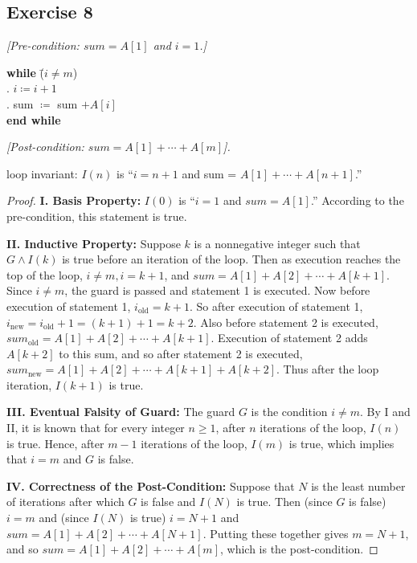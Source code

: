 \documentclass[14pt]{extarticle}
\begin{document}
\subsection{Exercise 8}
{\it [Pre-condition: $sum = A[1]$ and $i = 1$.]}

\begin{tabbing}
    {\bf while} \= ($i \neq m$) \\
    . $i \coloneqq i + 1$ \\
    . sum $\coloneqq$ sum $ + A[i]$ \\
    {\bf end while}
\end{tabbing}

{\it [Post-condition: $sum = A[1] + \cdots + A[m]$].}

loop invariant: $I(n)$ is ``$i = n + 1$ and sum = $A[1] + \cdots + A[n+1]$.''

\begin{proof}
    {\bf I. Basis Property:} $I(0)$ is “$i = 1$ and $sum = A[1]$.” According to the pre-condition, this statement is true.

        {\bf II. Inductive Property:} Suppose $k$ is a nonnegative integer such that $G \wedge I(k)$ is true before an iteration of the loop. Then as execution reaches the top of the loop, $i \neq m, i = k + 1$, and $sum = A[1] + A[2] + \cdots + A[k+1]$. Since $i \neq m$, the guard is passed and statement 1 is executed. Now before execution of statement 1, $i_{\text{old}} = k + 1$. So after execution of statement 1, $i_{\text{new}} = i_{\text{old}} + 1 = (k + 1) + 1 = k + 2$. Also before statement 2 is executed, $sum_{\text{old}} = A[1] + A[2] + \cdots + A[k+1]$. Execution of statement 2 adds $A[k + 2]$ to this sum, and so after statement 2 is executed, $sum_{\text{new}} = A[1] + A[2] + \cdots + A[k + 1] + A[k + 2]$. Thus after the loop iteration, $I(k + 1)$ is true.

        {\bf III. Eventual Falsity of Guard:} The guard $G$ is the condition $i \neq m$. By I and II, it is known that for every integer $n \geq 1$, after $n$ iterations of the loop, $I(n)$ is true. Hence, after $m - 1$ iterations of the loop, $I(m)$ is true, which implies that $i = m$ and $G$ is false.

        {\bf IV. Correctness of the Post-Condition:} Suppose that $N$ is the least number of iterations after which $G$ is false and $I(N)$ is true. Then (since $G$ is false) $i = m$ and (since $I(N)$ is true) $i = N + 1$ and $sum = A[1] + A[2] + \cdots + A[N+1]$. Putting these together gives $m = N + 1$, and so $sum = A[1] + A[2] + \cdots + A[m]$, which is the post-condition.
\end{proof}
\end{document}

